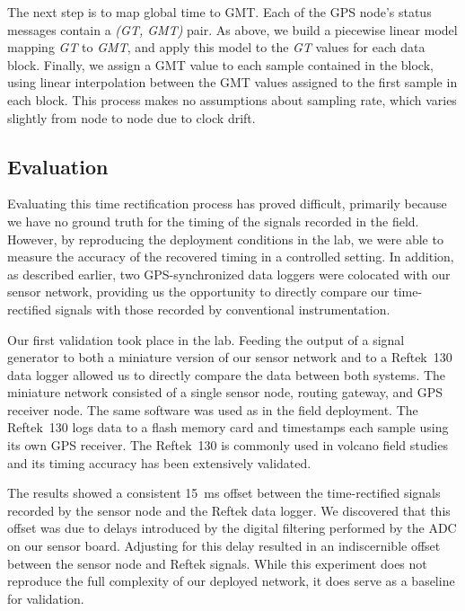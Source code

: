 The next step is to map global time to GMT. Each of the GPS node's status
messages contain a \textit{(GT, GMT)} pair. As above, we build a piecewise
linear model mapping \textit{GT} to \textit{GMT}, and apply this model to the
{\em GT} values for each data block. Finally, we assign a GMT value to each
sample contained in the block, using linear interpolation between the GMT
values assigned to the first sample in each block. This process makes no
assumptions about sampling rate, which varies slightly from node to node due
to clock drift.

\subsection{Evaluation}
\label{evaluation-timing-postdeployment}

Evaluating this time rectification process has proved difficult, primarily
because we have no ground truth for the timing of the signals recorded in the
field. However, by reproducing the deployment conditions in the lab, we were
able to measure the accuracy of the recovered timing in a controlled setting.
In addition, as described earlier, two GPS-synchronized data loggers were
colocated with our sensor network, providing us the opportunity to directly
compare our time-rectified signals with those recorded by conventional
instrumentation.

Our first validation took place in the lab. Feeding the output of a signal
generator to both a miniature version of our sensor network and to a
Reftek~130 data logger allowed us to directly compare the data between both
systems. The miniature network consisted of a single sensor node, routing
gateway, and GPS receiver node. The same software was used as in the field
deployment. The Reftek~130 logs data to a flash memory card and timestamps
each sample using its own GPS receiver. The Reftek~130 is commonly used in
volcano field studies and its timing accuracy has been extensively validated.

The results showed a consistent 15~ms offset between the time-rectified
signals recorded by the sensor node and the Reftek data logger. We discovered
that this offset was due to delays introduced by the digital filtering
performed by the ADC on our sensor board. Adjusting for this delay resulted
in an indiscernible offset between the sensor node and Reftek signals. While
this experiment does not reproduce the full complexity of our deployed
network, it does serve as a baseline for validation.

